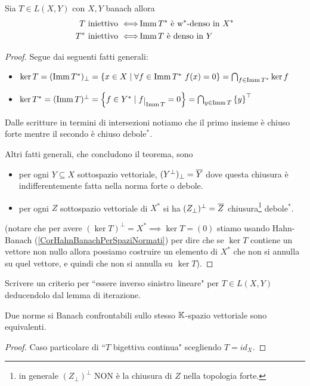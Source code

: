 \begin{theorem}\label{ThIniettivitaEAggiunti}
Sia $T\in L(X,Y)$ con $X,Y$ banach allora
\begin{align*}
    T\text{ iniettivo }\Longleftrightarrow&\operatorname{Imm} T^\ast\text{ \`e w$^{\ast}$-denso in }X^\ast\\
    T^\ast\text{ iniettivo }\Longleftrightarrow&\operatorname{Imm} T\text{ \`e denso in }Y
\end{align*}
\end{theorem}
\begin{proof}
Segue dai seguenti fatti generali:
\begin{itemize}
    \item $\ker T=(\operatorname{Imm} T^\ast)_\perp=\left\{{x\in X\mid \forall f\in \operatorname{Imm} T^\ast\ f(x)=0}\right\}=\bigcap_{f\in \operatorname{Imm} T^\ast}\ker f$
    \item $\ker T^\ast=(\imm T)^\perp=\cpa{f\in Y^\ast\mid f\res{\imm T}=0}=\bigcap_{y\in \imm T}\cpa{y}^\top$
\end{itemize}
Dalle scritture in termini di intersezioni notiamo che il primo insieme \`e chiuso forte mentre il secondo \`e chiuso debole$^\ast$.

Altri fatti generali, che concludono il teorema, sono
\begin{itemize}
    \item per ogni $Y\subseteq X$ sottospazio vettoriale, $(Y^\perp)_\perp=\overline{Y}$ dove questa chiusura \`e indifferentemente fatta nella norma forte o debole.
    \item per ogni $Z$ sottospazio vettoriale di $X^\ast$ si ha $(Z_\perp)^\perp=\overline{Z}$ chiusura\footnote{in generale $(Z_\perp)^\perp$ NON \`e la chiusura di $Z$ nella topologia forte.} debole$^\ast$.
\end{itemize}
(notare che per avere $(\ker T)^\perp=X^\ast\implies \ker T=(0)$ stiamo usando Hahn-Banach (\ref{CorHahnBanachPerSpaziNormati}) per dire che se $\ker T$ contiene un vettore non nullo allora possiamo costruire un elemento di $X^\ast$ che non si annulla su quel vettore, e quindi che non si annulla su $\ker T$).
\end{proof}

\begin{exercise}
Scrivere un criterio per ``essere inverso sinistro lineare" per $T\in L(X,Y)$ deducendolo dal lemma di iterazione.
\end{exercise}






\begin{proposition}\label{PrNormeConfrontabiliSuBanachSonoEquivalenti}
Due norme si Banach confrontabili sullo stesso $\mathbb{K}$-spazio vettoriale sono equivalenti.
\end{proposition}
\begin{proof}
Caso particolare di ``$T$ bigettiva continua" scegliendo $T=id_X$.
\end{proof}

